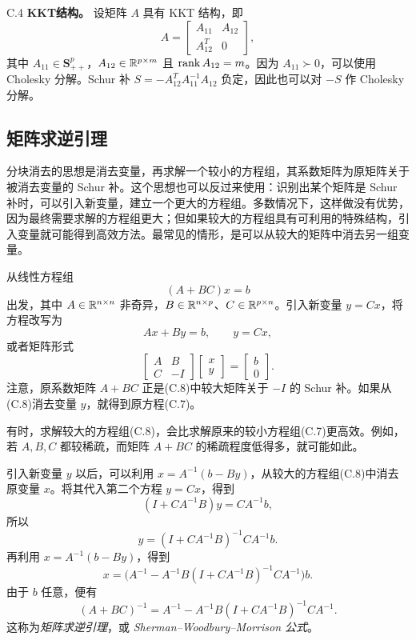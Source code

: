 \begin{origexample}{C.4}
\textbf{KKT结构。} 设矩阵 $A$ 具有 KKT 结构，即
\[
 A=\begin{bmatrix}A_{11}&A_{12}\\A_{12}^T&0\end{bmatrix},
\]
其中 $A_{11}\in\mathbf S_{++}^p$，$A_{12}\in\mathbb R^{p\times m}$ 且 $\operatorname{rank} A_{12}=m$。因为 $A_{11}\succ0$，可以使用 Cholesky 分解。Schur 补 $S=-A_{12}^TA_{11}^{-1}A_{12}$ 负定，因此也可以对 $-S$ 作 Cholesky 分解。
\end{origexample}

\subsection{矩阵求逆引理}
分块消去的思想是消去变量，再求解一个较小的方程组，其系数矩阵为原矩阵关于被消去变量的 Schur 补。这个思想也可以反过来使用：识别出某个矩阵是 Schur 补时，可以引入新变量，建立一个更大的方程组。多数情况下，这样做没有优势，因为最终需要求解的方程组更大；但如果较大的方程组具有可利用的特殊结构，引入变量就可能得到高效方法。最常见的情形，是可以从较大的矩阵中消去另一组变量。

从线性方程组
\begin{equation}
 (A+BC)x=b\tag{C.7}
\end{equation}
出发，其中 $A\in\mathbb R^{n\times n}$ 非奇异，$B\in\mathbb R^{n\times p}$、$C\in\mathbb R^{p\times n}$。引入新变量 $y=Cx$，将方程改写为
\[
 Ax+By=b,\qquad y=Cx,
\]
或者矩阵形式
\begin{equation}
 \begin{bmatrix}A&B\\C&-I\end{bmatrix}
 \begin{bmatrix}x\\y\end{bmatrix}=\begin{bmatrix}b\\0\end{bmatrix}.\tag{C.8}
\end{equation}
注意，原系数矩阵 $A+BC$ 正是(C.8)中较大矩阵关于 $-I$ 的 Schur 补。如果从(C.8)消去变量 $y$，就得到原方程(C.7)。

有时，求解较大的方程组(C.8)，会比求解原来的较小方程组(C.7)更高效。例如，若 $A,B,C$ 都较稀疏，而矩阵 $A+BC$ 的稀疏程度低得多，就可能如此。

引入新变量 $y$ 以后，可以利用 $x=A^{-1}(b-By)$，从较大的方程组(C.8)中消去原变量 $x$。将其代入第二个方程 $y=Cx$，得到
\[
 (I+CA^{-1}B)y=CA^{-1}b,
\]
所以
\[
 y=(I+CA^{-1}B)^{-1}CA^{-1}b.
\]
再利用 $x=A^{-1}(b-By)$，得到
\begin{equation}
 x=\bigl(A^{-1}-A^{-1}B(I+CA^{-1}B)^{-1}CA^{-1}\bigr)b.\tag{C.9}
\end{equation}
由于 $b$ 任意，便有
\[
 (A+BC)^{-1}=A^{-1}-A^{-1}B(I+CA^{-1}B)^{-1}CA^{-1}.
\]
这称为\emph{矩阵求逆引理}，或 \emph{Sherman--Woodbury--Morrison 公式}。

